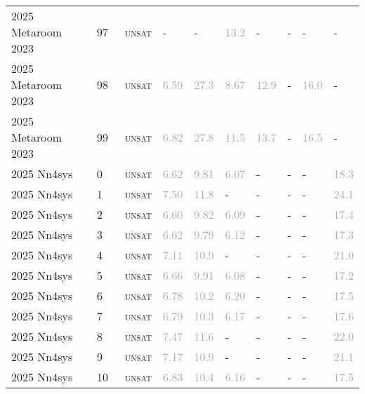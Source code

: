 \begin{center}
{\begin{longtable}{@{}llllllllll@{}}
2025 Metaroom 2023 & 97 & ~\textsc{unsat} & - & - & \textcolor{darkgray}{13.2} & - & - & - & - \\
2025 Metaroom 2023 & 98 & ~\textsc{unsat} & \textcolor{darkgray}{6.59} & \textcolor{darkgray}{27.3} & \textcolor{darkgray}{8.67} & \textcolor{darkgray}{12.9} & - & \textcolor{darkgray}{16.0} & - \\
2025 Metaroom 2023 & 99 & ~\textsc{unsat} & \textcolor{darkgray}{6.82} & \textcolor{darkgray}{27.8} & \textcolor{darkgray}{11.5} & \textcolor{darkgray}{13.7} & - & \textcolor{darkgray}{16.5} & - \\
\midrule
2025 Nn4sys & 0 & ~\textsc{unsat} & \textcolor{darkgray}{6.62} & \textcolor{darkgray}{9.81} & \textcolor{darkgray}{6.07} & - & - & - & \textcolor{darkgray}{18.3} \\
2025 Nn4sys & 1 & ~\textsc{unsat} & \textcolor{darkgray}{7.50} & \textcolor{darkgray}{11.8} & - & - & - & - & \textcolor{darkgray}{24.1} \\
2025 Nn4sys & 2 & ~\textsc{unsat} & \textcolor{darkgray}{6.60} & \textcolor{darkgray}{9.82} & \textcolor{darkgray}{6.09} & - & - & - & \textcolor{darkgray}{17.4} \\
2025 Nn4sys & 3 & ~\textsc{unsat} & \textcolor{darkgray}{6.62} & \textcolor{darkgray}{9.79} & \textcolor{darkgray}{6.12} & - & - & - & \textcolor{darkgray}{17.3} \\
2025 Nn4sys & 4 & ~\textsc{unsat} & \textcolor{darkgray}{7.11} & \textcolor{darkgray}{10.9} & - & - & - & - & \textcolor{darkgray}{21.0} \\
2025 Nn4sys & 5 & ~\textsc{unsat} & \textcolor{darkgray}{6.66} & \textcolor{darkgray}{9.91} & \textcolor{darkgray}{6.08} & - & - & - & \textcolor{darkgray}{17.2} \\
2025 Nn4sys & 6 & ~\textsc{unsat} & \textcolor{darkgray}{6.78} & \textcolor{darkgray}{10.2} & \textcolor{darkgray}{6.20} & - & - & - & \textcolor{darkgray}{17.5} \\
2025 Nn4sys & 7 & ~\textsc{unsat} & \textcolor{darkgray}{6.79} & \textcolor{darkgray}{10.3} & \textcolor{darkgray}{6.17} & - & - & - & \textcolor{darkgray}{17.6} \\
2025 Nn4sys & 8 & ~\textsc{unsat} & \textcolor{darkgray}{7.47} & \textcolor{darkgray}{11.6} & - & - & - & - & \textcolor{darkgray}{22.0} \\
2025 Nn4sys & 9 & ~\textsc{unsat} & \textcolor{darkgray}{7.17} & \textcolor{darkgray}{10.9} & - & - & - & - & \textcolor{darkgray}{21.1} \\
2025 Nn4sys & 10 & ~\textsc{unsat} & \textcolor{darkgray}{6.83} & \textcolor{darkgray}{10.4} & \textcolor{darkgray}{6.16} & - & - & - & \textcolor{darkgray}{17.5} \\

\end{longtable}}
\end{center}
